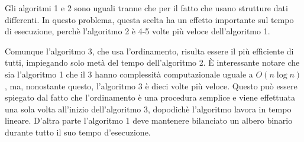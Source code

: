 Gli algoritmi 1 e 2 sono uguali tranne che per il 
fatto che usano strutture dati differenti.
In questo problema, questa scelta ha un effetto
importante sul tempo di esecuzione, perchè l'algoritmo 2
è 4-5 volte più veloce dell'algoritmo 1.

Comunque l'algoritmo 3, che usa l'ordinamento, risulta essere
il più efficiente di tutti, impiegando solo metà del tempo
dell'algoritmo 2.
È interessante notare che sia l'algoritmo 1 che il 3
hanno complessità computazionale uguale a $O(n \log n)$,
ma, nonostante questo, l'algoritmo 3 è dieci volte più veloce.
Questo può essere spiegato dal fatto che l'ordinamento è una
procedura semplice e viene effettuata una sola volta all'inizio
dell'algoritmo 3, dopodichè l'algoritmo lavora in 
tempo lineare.
D'altra parte l'algoritmo 1 deve mantenere bilanciato 
un albero binario durante tutto il suo tempo d'esecuzione.
